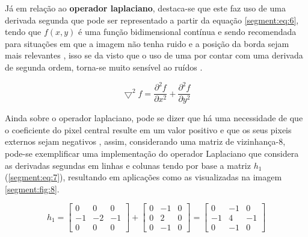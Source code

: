 Já em relação ao \textbf{operador laplaciano}, destaca-se que este faz uso de uma derivada segunda que pode ser representado a partir da equação \ref{segment:eq:6}, tendo que $f(x,y)$ é uma função bidimensional contínua e sendo recomendada para situações em que a imagem não tenha ruido e a posição da borda sejam mais relevantes \cite{Yuheng2017ImageOverview}, isso se da visto que o uso de uma por contar com uma derivada de segunda ordem, torna-se muito sensível ao ruídos \cite{pedrini2008analise}.

\begin{equation}
    \label{segment:eq:6}
    \bigtriangledown^2 f = \frac{\partial^2f}{\partial x^2} + \frac{\partial^2f}{\partial y^2}
\end{equation}

Ainda sobre o operador laplaciano, pode se dizer que há uma necessidade de que o coeficiente do pixel central resulte em um valor positivo e que os seus pixeis externos sejam negativos \cite{pedrini2008analise}, assim, considerando uma matriz de vizinhança-8, pode-se exemplificar uma implementação do operador Laplaciano que considera as derivadas segundas em linhas e colunas tendo por base a matriz $h_1$ (\ref{segment:eq:7}), resultando em aplicações como as visualizadas na imagem \ref{segment:fig:8}.

\begin{equation}
    \label{segment:eq:7}
    h_1 = \begin{bmatrix}
     0 &  0 &  0 \\ 
    -1 & -2 & -1 \\ 
     0 &  0 &  0
    \end{bmatrix} +
    \begin{bmatrix}
     0 & -1 & 0 \\ 
     0 &  2 & 0 \\ 
     0 & -1 & 0 
    \end{bmatrix} =
    \begin{bmatrix}
     0 & -1 & 0 \\ 
    -1 &  4 & -1 \\ 
     0 & -1 & 0 
    \end{bmatrix}
\end{equation}

